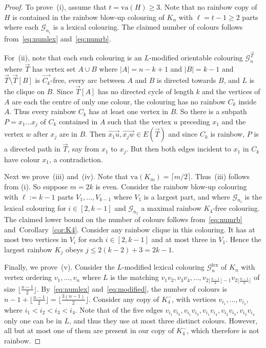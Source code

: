 \documentclass[a4paper, 12pt]{article}
\numberwithin{equation}{section}
\def\sm{{\setminus}}
\def\va{{\mathrm{va}}}
\def\lex{{\mathrm{lex}}}
\newcommand{\ova}[1]{\overrightarrow{#1}}
\newcommand{\ms}[1]{\mathscr{#1}}
\begin{document}
\begin{proof}

    To prove~(i), assume that  $t=\va(H)\ge 3$. Note that no rainbow copy of $H$ is contained in
 the rainbow blow-up colouring of $K_n$ with $\ell=t-1 \geq 2$ parts where each $\ms{G}_{n_i}$ is a lexical colouring.
The claimed number of colours follows from~\eqref{eq:numlex} and~\eqref{eq:numrb}.


For~(ii), 
note that each
such colouring is an $L$-modified orientable colouring $\ms{G}^{\ova{T}}_n$ where $\ova{T}$ has vertex set $A \cup B$ where $|A|=n-k+1$ and $|B|=k-1$ and $\ova{T} \sm \ova{T}[B]$ is $\ova{C_k}$-free, every arc between $A$ and $B$ is directed towards $B$, and $L$ is the clique on $B$. 
Since $\ova{T}[A]$ has no directed cycle of length $k$ and the vertices of $A$ are each the centre of only one colour, the colouring has no rainbow $C_k$ inside $A$.
Thus every rainbow $C_k$ has at least one vertex in $B$.
 So there is a subpath $P=x_1\ldots x_j$ of $C_k$ contained in $A$ such that
the vertex $u$ preceding $x_1$ and the vertex $w$ after $x_j$ are in $B$.
Then $\ova{x_1u},\ova{x_jw} \in E(\ova{T})$
and since $C_k$ is rainbow, $P$ is a directed path in $\ova{T}$, say from $x_1$ to $x_j$. But then both edges incident to $x_1$ in $C_k$ have colour $x_1$, a contradiction.


Next we prove~(iii) and~(iv).
Note that $\va(K_m)=\lceil m/2\rceil$.
Thus~(iii) follows from (i).
So suppose $m=2k$ is even.
Consider the rainbow blow-up colouring with $\ell := k-1$ parts $V_1,\ldots,V_{k-1}$ where $V_1$ is a largest part, and where $\ms{G}_{n_i}$ is the lexical colouring for $i \in [2,k-1]$ and 
$\ms{G}_{n_1}$ a maximal rainbow $K_4$-free colouring.
The claimed lower bound on the number of colours follows from~\eqref{eq:numrb} and~Corollary~\ref{cor:K4}.
Consider any rainbow clique in this colouring. It has at most two vertices in $V_i$ for each $i \in [2,k-1]$ and at most three in $V_1$. Hence the largest rainbow $K_j$ obeys $j\le 2(k-2)+3=2k-1$.  

Finally, we prove~(v).
Consider the $L$-modified lexical colouring $\ms{G}^{\lex}_n$ of $K_n$ with vertex ordering $v_1,\ldots,v_n$ where $L$ is the matching $v_1v_2,v_3v_4,\ldots,v_{2\lfloor\frac{n-1}{2}\rfloor-1}v_{2\lfloor\frac{n-1}{2}\rfloor}$ of size $\lfloor\frac{n-1}{2}\rfloor$. By~\eqref{eq:numlex} and~\eqref{eq:modified}, the number of colours is $n-1+\lfloor\frac{n-1}{2}\rfloor = \lfloor\frac{3(n-1)}{2}\rfloor$.
Consider any  copy of $K_4^-$, with vertices $v_{i_1},\ldots,v_{i_4}$, where $i_1 < i_2<i_3 < i_4$. Note that of the five edges $v_{i_1}v_{i_2}, v_{i_1}v_{i_3}, v_{i_1}v_{i_4}, v_{i_2}v_{i_3}, v_{i_2}v_{i_4}$ 
only one can be in $L$, and thus they use at most three distinct colours. However, all but at most one of them are present in our copy of $K_4^-$, which therefore is not rainbow.
\end{proof}
\end{document}
